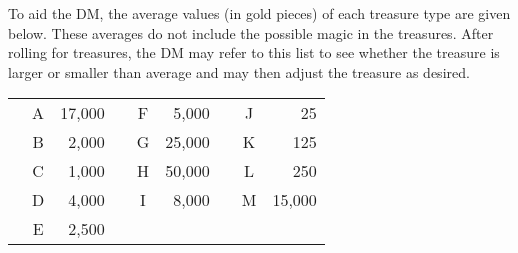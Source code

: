 \documentclass[letterpaper,serif,tightsqueeze]{rpg-module}
\begin{document}
To aid the DM, the average values (in gold pieces) of each treasure
type are given below. These averages do not include the possible
magic in the treasures. After rolling for treasures, the DM may refer
to this list to see whether the treasure is larger or smaller than
average and may then adjust the treasure as desired.

\begin{tabular}{p{0.25cm} c r p{0.25cm} c r p{0.25cm} c r}
& A & 17,000 & & F &  5,000 & & J &     25\\
& B &  2,000 & & G & 25,000 & & K &    125\\
& C &  1,000 & & H & 50,000 & & L &    250\\
& D &  4,000 & & I &  8,000 & & M & 15,000\\
& E &  2,500\\
\end{tabular}
\end{document}
